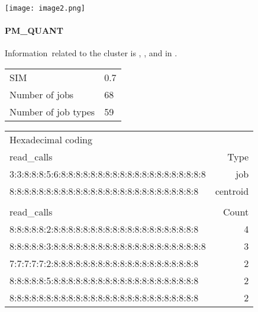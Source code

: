 \documentclass{jhps}
\begin{document}
\begingroup
  \centering
  \texttt{[image: image2.png]}
  \label{fig:use_case:hex_native:length}
\endgroup

\paragraph{PM\_QUANT}
Information\ related to the cluster is , , and in .

\begingroup
  \centering
  \begin{tabular}{ll}
    SIM                 & 0.7 \\
    Number of jobs      & 68  \\
    Number of job types & 59  \\
  \end{tabular}
  \label{tab:use_case:pm_quant:stats}
\endgroup

\begingroup
  \centering
  \begin{tiny}
    \begin{tabular}{@{ }l@{ }|@{ }r@{ }}
      \rowcolor{tabhcolor}
      Hexadecimal coding & \\
      \rowcolor{tabhcolor}
      read\_calls                                           & Type     \\
      \hline
      3:3:8:8:8:5:6:8:8:8:8:8:8:8:8:8:8:8:8:8:8:8:8:8:8:8:8 & job      \\
      8:8:8:8:8:8:8:8:8:8:8:8:8:8:8:8:8:8:8:8:8:8:8:8:8:8   & centroid \\
      \multicolumn{2}{l}{}\\
      \rowcolor{tabhcolor}
      read\_calls                                           & Count    \\
      \hline
      8:8:8:8:8:2:8:8:8:8:8:8:8:8:8:8:8:8:8:8:8:8:8:8:8:8   & 4        \\
      8:8:8:8:8:3:8:8:8:8:8:8:8:8:8:8:8:8:8:8:8:8:8:8:8:8:8 & 3        \\
      7:7:7:7:7:2:8:8:8:8:8:8:8:8:8:8:8:8:8:8:8:8:8:8:8:8   & 2        \\
      8:8:8:8:8:5:8:8:8:8:8:8:8:8:8:8:8:8:8:8:8:8:8:8:8:8   & 2        \\
      8:8:8:8:8:8:8:8:8:8:8:8:8:8:8:8:8:8:8:8:8:8:8:8:8:8   & 2        \\
    \end{tabular}
  \end{tiny}
  \label{tab:use_case:pm_quant:top_jobs}
\endgroup
\end{document}
